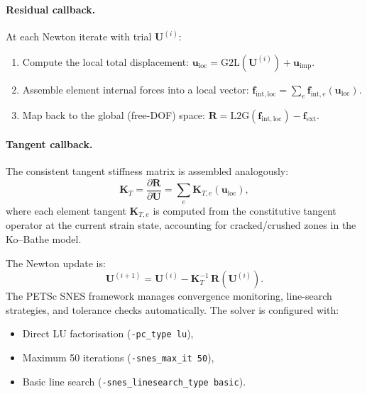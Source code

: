 \paragraph{Residual callback.}
At each Newton iterate with trial $\mathbf{U}^{(i)}$:
\begin{enumerate}
  \item Compute the local total displacement:
        $\mathbf{u}_{\mathrm{loc}} = \mathrm{G2L}(\mathbf{U}^{(i)})
         + \mathbf{u}_{\mathrm{imp}}$.
  \item Assemble element internal forces into a local vector:
        $\mathbf{f}_{\mathrm{int,loc}}
         = \sum_e \mathbf{f}_{\mathrm{int},e}(\mathbf{u}_{\mathrm{loc}})$.
  \item Map back to the global (free-DOF) space:
        $\mathbf{R} = \mathrm{L2G}(\mathbf{f}_{\mathrm{int,loc}})
         - \mathbf{f}_{\mathrm{ext}}$.
\end{enumerate}

\paragraph{Tangent callback.}
The consistent tangent stiffness matrix is assembled analogously:
\begin{equation}
  \mathbf{K}_T
  = \frac{\partial \mathbf{R}}{\partial \mathbf{U}}
  = \sum_e \mathbf{K}_{T,e}(\mathbf{u}_{\mathrm{loc}}),
  \label{eq:nlevo-tangent}
\end{equation}
where each element tangent $\mathbf{K}_{T,e}$ is computed from the
constitutive tangent operator at the current strain state, accounting
for cracked/crushed zones in the Ko--Bathe model.

The Newton update is:
\begin{equation}
  \mathbf{U}^{(i+1)}
  = \mathbf{U}^{(i)}
  - \mathbf{K}_T^{-1}\,\mathbf{R}(\mathbf{U}^{(i)}).
  \label{eq:nlevo-newton}
\end{equation}
The PETSc SNES framework manages convergence monitoring, line-search
strategies, and tolerance checks automatically.  The solver is
configured with:
\begin{itemize}
  \item Direct LU factorisation (\texttt{-pc\_type lu}),
  \item Maximum 50 iterations (\texttt{-snes\_max\_it 50}),
  \item Basic line search (\texttt{-snes\_linesearch\_type basic}).
\end{itemize}


